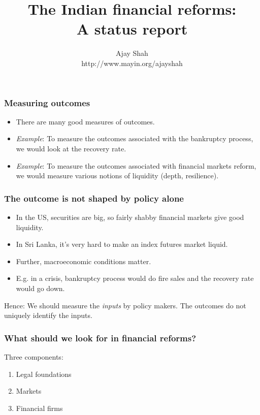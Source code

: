 \documentclass{beamer}
\title{The Indian financial reforms:\\ A status report}
\author{Ajay Shah\\
http://www.mayin.org/ajayshah}
\begin{document}
\begin{frame}
  \titlepage
\end{frame}

\begin{frame}
  \frametitle{Measuring outcomes}
  \begin{itemize}
  \item There are many good measures of outcomes.
  \item \textit{Example}: To measure the outcomes associated with the
    bankruptcy process, we would look at the recovery rate.
  \item \textit{Example}: To measure the outcomes associated with
    financial markets reform, we would measure various notions of
    liquidity (depth, resilience). 
  \end{itemize}
\end{frame}

\begin{frame}
  \frametitle{The outcome is not shaped by policy alone}
  \begin{itemize}
  \item In the US, securities are big, so fairly shabby financial
    markets give good liquidity.
  \item In Sri Lanka, it's very hard to make an index futures market
    liquid.
  \item Further, macroeconomic conditions matter.
  \item E.g. in a crisis, bankruptcy process would do fire sales and
    the recovery rate would go down.
  \end{itemize}

  Hence: We should measure the \textit{inputs} by policy makers. The
  outcomes do not uniquely identify the inputs.
\end{frame}

\begin{frame}
  \frametitle{What should we look for in financial reforms?}
  Three components:

  \begin{enumerate}
  \item Legal foundations
  \item Markets
  \item Financial firms
  \end{enumerate}
\end{frame}
\end{document}
